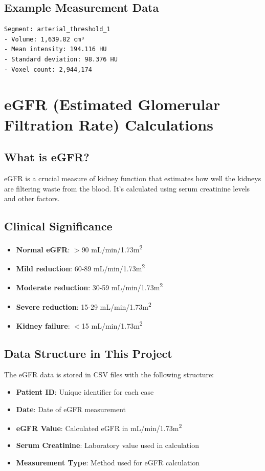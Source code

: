 \documentclass{article}
\begin{document}
\subsection{Example Measurement Data}
\begin{verbatim}
Segment: arterial_threshold_1
- Volume: 1,639.82 cm³
- Mean intensity: 194.116 HU
- Standard deviation: 98.376 HU
- Voxel count: 2,944,174
\end{verbatim}

\section{eGFR (Estimated Glomerular Filtration Rate) Calculations}

\subsection{What is eGFR?}

eGFR is a crucial measure of kidney function that estimates how well the kidneys are filtering waste from the blood. It's calculated using serum creatinine levels and other factors.

\subsection{Clinical Significance}
\begin{itemize}
    \item \textbf{Normal eGFR}: $>$90 mL/min/1.73m\textsuperscript{2}
    \item \textbf{Mild reduction}: 60-89 mL/min/1.73m\textsuperscript{2}
    \item \textbf{Moderate reduction}: 30-59 mL/min/1.73m\textsuperscript{2}
    \item \textbf{Severe reduction}: 15-29 mL/min/1.73m\textsuperscript{2}
    \item \textbf{Kidney failure}: $<$15 mL/min/1.73m\textsuperscript{2}
\end{itemize}

\subsection{Data Structure in This Project}

The eGFR data is stored in CSV files with the following structure:
\begin{itemize}
    \item \textbf{Patient ID}: Unique identifier for each case
    \item \textbf{Date}: Date of eGFR measurement
    \item \textbf{eGFR Value}: Calculated eGFR in mL/min/1.73m\textsuperscript{2}
    \item \textbf{Serum Creatinine}: Laboratory value used in calculation
    \item \textbf{Measurement Type}: Method used for eGFR calculation
\end{itemize}
\end{document}
